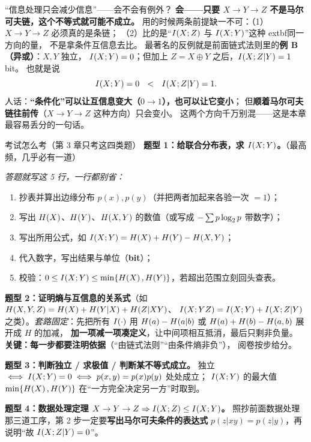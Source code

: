 \begin{qa}{“信息处理只会减少信息”——会不会有例外？}
\textbf{会——只要 $X\to Y\to Z$ 不是马尔可夫链，这个不等式就可能不成立。}
用的时候两条前提缺一不可：（1）$X\to Y\to Z$ 必须真的是条链；
（2）比的是“$I\!\left(X;Z\right)$ 与 $I\!\left(X;Y\right)$”这种	extbf{同一方向}的量，
不是拿条件互信息去比。
最著名的反例就是前面链式法则里的\textbf{例 B（异或）}：$X,Y$ 独立，
$I\!\left(X;Y\right)=0$；但加上 $Z=X\oplus Y$ 之后，$I\!\left(X;Z|Y\right)=1$ bit。
也就是说
\[
I\!\left(X;Y\right)=0\ \ <\ \ I\!\left(X;Z|Y\right)=1 .
\]
人话：\textbf{“条件化”可以让互信息变大（$0\to1$），也可以让它变小}；
但\textbf{顺着马尔可夫链往前传}（$X\to Y\to Z$ 这种方向）只会变小。
这两个方向千万别混——这是本章最容易丢分的一句话。
\end{qa}

\begin{exam}{考试怎么考（第 3 章只考这四类题）}
\textbf{题型 1：给联合分布表，求 $I\!\left(X;Y\right)$。}（最高频，几乎必有一道）

\emph{答题就写这 5 行，一行都别省：}
\begin{enumerate}[leftmargin=1.8em,itemsep=1pt,topsep=1pt]
  \item 抄表并算出边缘分布 $p(x),p(y)$（并把两者加起来各验一次 $=1$）；
  \item 写出 $H\!\left(X\right)$、$H\!\left(Y\right)$、$H\!\left(X,Y\right)$ 的数值（或写成 $-\sum p\log_{2} p$ 带数字）；
  \item 写出所用公式，如 $I\!\left(X;Y\right)=H\!\left(X\right)+H\!\left(Y\right)-H\!\left(X,Y\right)$；
  \item 代入数字，写出结果与单位（\textbf{bit}）；
  \item 校验：$0\le I\!\left(X;Y\right)\le\min\{H\!\left(X\right),H\!\left(Y\right)\}$，若超出范围立刻回头查表。
\end{enumerate}

\textbf{题型 2：证明熵与互信息的关系式}（如 $H\!\left(X,Y,Z\right)=H\!\left(X\right)+H\!\left(Y|X\right)+H\!\left(Z|XY\right)$、
$I\!\left(X;YZ\right)=I\!\left(X;Y\right)+I\!\left(X;Z|Y\right)$ 之类）。\emph{套路固定}：先把所有 $I\!\left(\cdot\right)$ 用
$H\!\left(a\right)-H\!\left(a|b\right)$ 或 $H\!\left(a\right)+H\!\left(b\right)-H\!\left(a,b\right)$ 展开成 $H$ 的加减，
\textbf{加一项减一项凑定义}，让中间项相互抵消，最后只剩非负量。
\textbf{关键：每一步都要注明依据}（“由链式法则”“由条件熵非负”），
阅卷按步给分。

\textbf{题型 3：判断独立 / 求极值 / 判断某不等式成立。}
独立 $\iff I\!\left(X;Y\right)=0\iff p(x,y)=p(x)p(y)$ 处处成立；
$I\!\left(X;Y\right)$ 的最大值 $\min\{H\!\left(X\right),H\!\left(Y\right)\}$ 在“一方完全决定另一方”时取到。

\textbf{题型 4：数据处理定理 $X\to Y\to Z\Rightarrow I\!\left(X;Z\right)\le I\!\left(X;Y\right)$。}
照抄前面数据处理那三道工序，第 2 步一定要\textbf{写出马尔可夫条件的表达式}
$p(z|xy)=p(z|y)$，再说明“故 $I\!\left(X;Z|Y\right)=0$”。


\end{exam}
